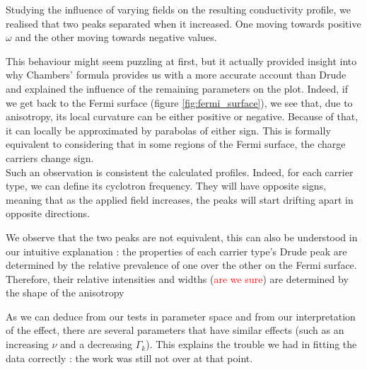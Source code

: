 Studying the influence of varying fields on the resulting conductivity profile, 
we realised that two peaks separated when it increased. 
One moving towards positive $\omega$ and the other moving towards negative values. 

This behaviour might seem puzzling at first, 
but it actually provided insight into why Chambers' formula provides us with a more accurate account than Drude 
and explained the influence of the remaining parameters on the plot. 
Indeed, if we get back to the Fermi surface (figure \ref{fig:fermi_surface}), 
we see that, due to anisotropy, its local curvature can be either positive or negative. 
Because of that, it can locally be approximated by parabolas of either sign. 
This is formally equivalent to considering that in some regions of the Fermi surface, 
the charge carriers change sign. \\

Such an observation is consistent the calculated profiles. 
Indeed, for each carrier type, we can define its cyclotron frequency. 
They will have opposite signs, meaning that as the applied field increases, 
the peaks will start drifting apart in opposite directions.

We observe that the two peaks are not equivalent, 
this can also be understood in our intuitive explanation : 
the properties of each carrier type's Drude peak are determined by the relative prevalence of one over the other on the Fermi surface. 
Therefore, their relative intensities and widths (\textcolor{red}{are we sure}) are determined by the shape of the anisotropy

As we can deduce from our tests in parameter space and from our interpretation of the effect, 
there are several parameters that have similar effects 
(such as an increasing $\nu$ and a decreasing $\Gamma_k$). 
This explains the trouble we had in fitting the data correctly : 
the work was still not over at that point.
